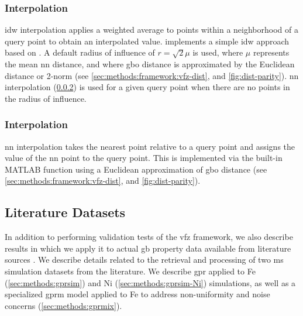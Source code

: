 \documentclass[final,twocolumn,12pt]{elsarticle}
\begin{document}
\subsubsection{ Interpolation}
\label{sec:methods:interp:idw}

\Gls{idw} interpolation applies a weighted average to points within a neighborhood of a query point to obtain an interpolated value.  implements a simple \gls{idw} approach based on \cite{tovarInverseDistanceWeight2020}. A default radius of influence of $r=\sqrt{2} \mu$ is used, where $\mu$ represents the mean \gls{nn} distance, and where \gls{gbo} distance is approximated by the Euclidean distance or 2-norm (see \cref{sec:methods:framework:vfz-dist}, and \cref{fig:dist-parity}). \gls{nn} interpolation (\cref{sec:methods:interp:nn}) is used for a given query point when there are no \inpt{} points in the radius of influence. %

\subsubsection{ Interpolation}
\label{sec:methods:interp:nn}

\Gls{nn} interpolation takes the nearest \inpt{} point relative to a query point and assigns the value of the \gls{nn} \inpt{} point to the query point. This is implemented via the built-in MATLAB function  using a Euclidean approximation of \gls{gbo} distance (see \cref{sec:methods:framework:vfz-dist}, and \cref{fig:dist-parity}). %

\subsection{Literature Datasets}
\label{sec:methods:litdata}
In addition to performing validation tests of the \gls{vfz} framework, we also describe results in which we apply it to actual \gls{gb} property data available from literature sources \cite{olmstedSurveyComputedGrain2009,kimPhasefieldModeling3D2014}. We describe details related to the retrieval and processing of two \gls{ms} simulation datasets from the literature. We describe \gls{gpr} applied to Fe (\cref{sec:methods:gprsim}) and Ni (\cref{sec:methods:gprsim-Ni}) simulations, as well as a specialized \gls{gprm} model applied to Fe to address non-uniformity and noise concerns (\cref{sec:methods:gprmix}).
\end{document}

